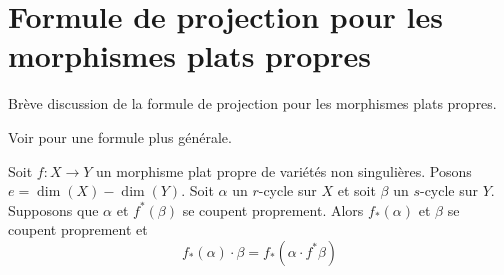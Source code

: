 \section{Formule de projection pour les morphismes plats propres}
\label{section-projection-formula-flat}

\noindent
Brève discussion de la formule de projection pour les morphismes plats propres.

\begin{lemma}
\label{lemma-projection-formula-flat}
\begin{reference}
Voir \cite[chapitre V, C), section 7, formule (10)]{Serre_algebre_locale}
pour une formule plus générale.
\end{reference}
Soit $f : X \to Y$ un morphisme plat propre de variétés non singulières.
Posons $e = \dim(X) - \dim(Y)$. Soit $\alpha$ un $r$-cycle sur $X$ et soit
$\beta$ un $s$-cycle sur $Y$. Supposons que $\alpha$ et $f^*(\beta)$ se coupent
proprement. Alors $f_*(\alpha)$ et $\beta$ se coupent proprement et
$$
f_*(\alpha) \cdot \beta = f_*( \alpha \cdot f^*\beta)
$$
\end{lemma}

